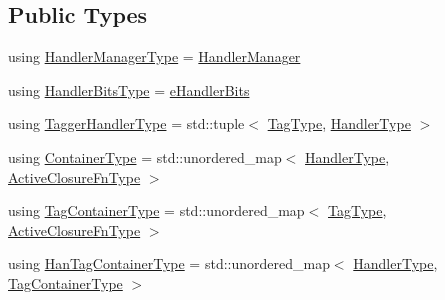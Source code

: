 \subsection*{Public Types}
\begin{DoxyCompactItemize}
\item 
using \hyperlink{structvt_1_1registry_1_1_registry_a0717ad6519a3d2c6f3e1848182db4bfa}{Handler\+Manager\+Type} = \hyperlink{structvt_1_1_handler_manager}{Handler\+Manager}
\item 
using \hyperlink{structvt_1_1registry_1_1_registry_acf13f3553c4f5c82dd9bd1cb716d435f}{Handler\+Bits\+Type} = \hyperlink{namespacevt_af182285b57b225b163d5d8aff03cb8c2}{e\+Handler\+Bits}
\item 
using \hyperlink{structvt_1_1registry_1_1_registry_aed8ec48ac909aea3e4dbc21aa6f8e898}{Tagger\+Handler\+Type} = std\+::tuple$<$ \hyperlink{namespacevt_a84ab281dae04a52a4b243d6bf62d0e52}{Tag\+Type}, \hyperlink{namespacevt_af64846b57dfcaf104da3ef6967917573}{Handler\+Type} $>$
\item 
using \hyperlink{structvt_1_1registry_1_1_registry_ac9e1297d26b6c553ccdaa46858cdb3b8}{Container\+Type} = std\+::unordered\+\_\+map$<$ \hyperlink{namespacevt_af64846b57dfcaf104da3ef6967917573}{Handler\+Type}, \hyperlink{namespacevt_a2a06c34cafcd511828f16cbf1476b924}{Active\+Closure\+Fn\+Type} $>$
\item 
using \hyperlink{structvt_1_1registry_1_1_registry_abefc9cdcc8557c5d547dd3ae44ae0996}{Tag\+Container\+Type} = std\+::unordered\+\_\+map$<$ \hyperlink{namespacevt_a84ab281dae04a52a4b243d6bf62d0e52}{Tag\+Type}, \hyperlink{namespacevt_a2a06c34cafcd511828f16cbf1476b924}{Active\+Closure\+Fn\+Type} $>$
\item 
using \hyperlink{structvt_1_1registry_1_1_registry_ab5d336044aee749d39c8feabe4fa6983}{Han\+Tag\+Container\+Type} = std\+::unordered\+\_\+map$<$ \hyperlink{namespacevt_af64846b57dfcaf104da3ef6967917573}{Handler\+Type}, \hyperlink{structvt_1_1registry_1_1_registry_abefc9cdcc8557c5d547dd3ae44ae0996}{Tag\+Container\+Type} $>$
\end{DoxyCompactItemize}
